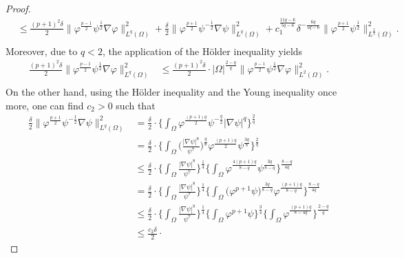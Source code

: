 \documentclass[12pt]{article}
\theoremstyle{plain}
\theoremstyle{definition}
\numberwithin{equation}{section}
\begin{document}
\begin{proof}
\begin{equation}
\begin{split}
       &\leq\frac{(p+1)^2 \delta}{2}\|\varphi^{\frac{p-1}{2}}\psi^{\frac1 2}\nabla\varphi\|_{L^q(\Omega)}^2+\frac{\delta}{2}\|\varphi^{\frac{p+1}{2}}\psi^{-\frac1 2}\nabla\psi\|_{L^q(\Omega)}^2
       +c_1^{\frac{11q-6}{5q-6}}\delta^{-\frac{6q}{5q-6}}\|\varphi^{\frac{p+1}{2}}\psi^{\frac1 2}\|_{L^{\frac2 3}(\Omega)}^{2}.\\
        \end{split}
    \end{equation}
   Moreover, due to $q<2$,  the application of the H\"{o}lder inequality yields
    \begin{equation}
        \begin{split}
            \frac{(p+1)^2 \delta}{2}\|\varphi^{\frac{p-1}{2}}\psi^{\frac1 2}\nabla\varphi\|_{L^q(\Omega)}^2&\leq\frac{(p+1)^2 \delta}{2}\cdot|\Omega|^{\frac{2-q}{q}}\|\varphi^{\frac{p-1}{2}}\psi^{\frac1 2}\nabla\varphi\|_{L^2(\Omega)}^2.\\
        \end{split}
    \end{equation}
    On the other hand, using the H\"{o}lder inequality and the Young inequality once more, one can find $c_2>0$ such that
    \begin{align}
            \frac{\delta}{2}\|\varphi^{\frac{p+1}{2}}\psi^{-\frac1 2}\nabla\psi\|_{L^q(\Omega)}^2&=\frac{\delta}{2}\cdot\bigg\{\int_\Omega\varphi^{\frac{(p+1)q}{2}}\psi^{-\frac q 2}|\nabla\psi|^q\bigg\}^{\frac2 q}\nonumber\\
            &=\frac{\delta}{2}\cdot\bigg\{\int_\Omega\bigg(\frac{|\nabla\psi|^8}{\psi^7}\bigg)^{\frac{q}{8}}\varphi^{\frac{(p+1)q}{2}}\psi^{\frac {3q} 8}\bigg\}^{\frac2 q}\nonumber\\
            &\leq\frac{\delta}{2}\cdot\bigg\{\int_\Omega\frac{|\nabla\psi|^8}{\psi^7}\bigg\}^{\frac{1}{4}}\bigg\{\int_\Omega\varphi^{\frac{4(p+1)q}{8-q}}\psi^{\frac {3q} {8-q}}\bigg\}^{\frac{8-q} {4q}}\nonumber\\
            &=\frac{\delta}{2}\cdot\bigg\{\int_\Omega\frac{|\nabla\psi|^8}{\psi^7}\bigg\}^{\frac{1}{4}}\bigg\{\int_\Omega\big(\varphi^{p+1}\psi\big)^{\frac {3q} {8-q}}\varphi^{\frac{(p+1)q}{8-q}}\bigg\}^{\frac{8-q} {4q}}\\
            &\leq\frac{\delta}{2}\cdot
            \bigg\{\int_\Omega\frac{|\nabla\psi|^8}{\psi^7}\bigg\}^{\frac{1}{4}}
            \bigg\{\int_\Omega\varphi^{p+1}\psi\bigg\}^{\frac{3} {4}}\bigg\{\int_\Omega\varphi^{\frac{(p+1)q}{8-4q}}\bigg\}^{\frac{2-q} {q}}\nonumber\\
             &\leq\frac{c_2\delta}{2}\cdot

\end{align}
\end{proof}
\end{document}

